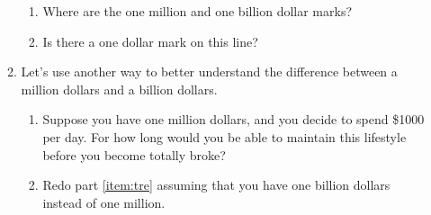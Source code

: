 \documentclass[11pt,dvipsnames]{article}
\begin{document}
\begin{enumerate}[label= {\bf  \arabic*:}]
\begin{enumerate}
\begin{enumerate}
		\item Where are the one million and one billion dollar marks?
		\item Is there a one dollar mark on this line?
	\end{enumerate}
	\item Let's use another way to better understand the difference between a million dollars and a billion dollars.
	\begin{enumerate}
		\item \label{item:tre} Suppose you have one million dollars, and you decide to spend \$1000 per day. For how long would you be able to maintain this lifestyle before you become totally broke?
		\item Redo part \ref{item:tre} assuming that you have one billion dollars instead of one million.
	\end{enumerate}
\end{enumerate}
\end{enumerate}
\end{document}
